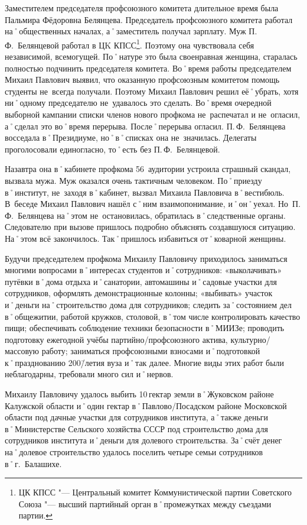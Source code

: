 Заместителем председателя профсоюзного комитета длительное время была Пальмира Фёдоровна Белянцева. Председатель профсоюзного комитета работал на˚общественных началах, а˚заместитель получал зарплату. Муж П.\,Ф.~Белянцевой работал в ЦK КПСС\footnote{ЦК КПСС "--- Центральный комитет Коммунистической партии Советского Союза "--- высший партийный орган в˚промежутках между съездами партии.}. Поэтому она чувствовала себя независимой, всемогущей. По˚натуре это была своенравная женщина, старалась полностью подчинить председателя комитета. Во˚время работы председателем Михаил Павлович выявил, что оказанную профсоюзным комитетом помощь студенты не~всегда получали. Поэтому Михаил Павлович решил её˚убрать, хотя ни˚одному председателю не~удавалось это сделать. Во˚время очередной выборной кампании списки членов нового профкома не~распечатал и не~огласил, а˚сделал это во˚время перерыва. После˚перерыва огласил. П.\,Ф.~Белянцева восседала в˚Президиуме, но˚в˚списках она не~значилась. Делегаты проголосовали единогласно, то˚есть без П.\,Ф.~Белянцевой. 

Назавтра она в˚кабинете профкома 56~аудитории устроила страшный скандал, вызвала мужа. Муж оказался очень тактичным человеком. По˚приезду в˚институт, не~заходя в˚кабинет, вызвал Михаила Павловича в˚вестибюль. В~беседе Михаил Павлович нашёл с˚ним взаимопонимание, и˚он˚уехал. Но~П.\,Ф.~Белянцева на˚этом не~остановилась, обратилась в˚следственные органы. Следователю при вызове пришлось подробно объяснять создавшуюся ситуацию. На˚этом всё закончилось. Так˚пришлось избавиться от˚коварной женщины. 

Будучи председателем профкома Михаилу Павловичу приходилось заниматься многими вопросами в˚интересах студентов и˚сотрудников: 
«выколачивать» путёвки в˚дома отдыха и˚санатории, автомашины и˚садовые участки для сотрудников, оформлять демонстрационные колонны;
«выбивать» участок и˚деньги на˚строительство дома для сотрудников;  
следить за˚состоянием дел в˚общежитии, работой кружков, столовой, в˚том числе контролировать качество пищи;
обеспечивать соблюдение техники безопасности в˚МИИЗе;
проводить подготовку ежегодной учёбы партийно\-/профсоюзного актива, культурно\-/массовую работу; 
заниматься профсоюзными взносами и˚подготовкой к˚празднованию 200\=/летия вуза и˚так далее. Многие виды этих работ были неблагодарны, требовали много сил и˚нервов. 

Михаилу Павловичу удалось выбить 10\,гектар земли в˚Жуковском районе Калужской области и˚один гектар в˚Павлово\-/Посадском районе Московской области под дачные участки для сотрудников института, а˚также деньги в˚Министерстве Сельского хозяйства СССР под строительство дома для сотрудников института и˚деньги для долевого строительства. За˚счёт денег на˚долевое строительство удалось поселить четыре семьи сотрудников в˚г.~Балашихе.

